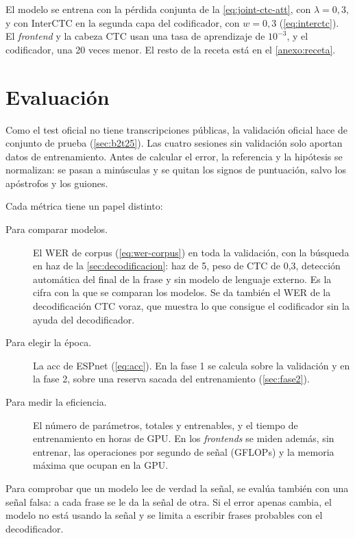 El modelo se entrena con la pérdida conjunta de la \cref{eq:joint-ctc-att}, con $\lambda = 0{,}3$, y con InterCTC en la segunda capa del codificador, con $w = 0{,}3$ (\cref{eq:interctc}). El \textit{frontend} y la cabeza CTC usan una tasa de aprendizaje de $10^{-3}$, y el codificador, una 20 veces menor. El resto de la receta está en el \cref{anexo:receta}.

\section{Evaluación}
\label{sec:protocolo-evaluacion}

Como el test oficial no tiene transcripciones públicas, la validación oficial hace de conjunto de prueba (\cref{sec:b2t25}). Las cuatro sesiones sin validación solo aportan datos de entrenamiento. Antes de calcular el error, la referencia y la hipótesis se normalizan: se pasan a minúsculas y se quitan los signos de puntuación, salvo los apóstrofos y los guiones.

Cada métrica tiene un papel distinto:

\begin{description}
  \item[Para comparar modelos.] El WER de corpus (\cref{eq:wer-corpus}) en toda la validación, con la búsqueda en haz de la \cref{sec:decodificacion}: haz de 5, peso de CTC de 0,3, detección automática del final de la frase y sin modelo de lenguaje externo. Es la cifra con la que se comparan los modelos. Se da también el WER de la decodificación CTC voraz, que muestra lo que consigue el codificador sin la ayuda del decodificador.
  \item[Para elegir la época.] La acc de ESPnet (\cref{eq:acc}). En la fase 1 se calcula sobre la validación y en la fase 2, sobre una reserva sacada del entrenamiento (\cref{sec:fase2}).
  \item[Para medir la eficiencia.] El número de parámetros, totales y entrenables, y el tiempo de entrenamiento en horas de GPU. En los \textit{frontends} se miden además, sin entrenar, las operaciones por segundo de señal (GFLOPs) y la memoria máxima que ocupan en la GPU.
\end{description}

Para comprobar que un modelo lee de verdad la señal, se evalúa también con una señal falsa: a cada frase se le da la señal de otra. Si el error apenas cambia, el modelo no está usando la señal y se limita a escribir frases probables con el decodificador.

